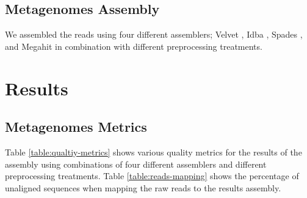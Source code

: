\subsection*{Metagenomes Assembly}
We assembled the reads using four different assemblers; Velvet \cite{velvet}, Idba \cite{idea}, Spades \cite{spades}, and Megahit \cite{megahit} in combination with different preprocessing treatments. 

\section*{Results}

\subsection*{Metagenomes Metrics}   
Table \ref {table:qualtiy-metrics} shows various quality metrics for the results of the assembly using combinations of four different assemblers and different preprocessing treatments. Table \ref {table:reads-mapping} shows  the percentage of unaligned sequences when mapping the raw reads to the results assembly. 

